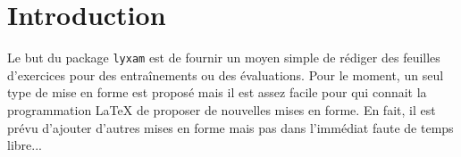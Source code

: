 \documentclass[12pt,a4paper]{article}
\theoremstyle{definition}
\begin{document}
\section{Introduction}

Le but du package \verb+lyxam+ est de fournir un moyen simple de rédiger des feuilles d'exercices pour des entraînements ou des évaluations.
Pour le moment, un seul type de mise en forme est proposé mais il est assez facile pour qui connait la programmation \LaTeX{} de proposer de nouvelles mises en forme.
En fait, il est prévu d'ajouter d'autres mises en forme mais pas dans l'immédiat faute de temps libre...
\end{document}
